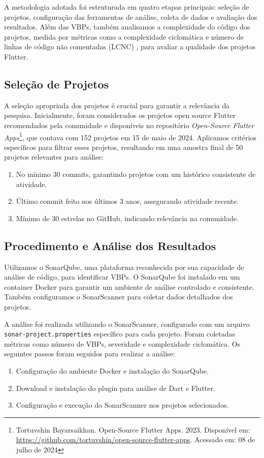 \documentclass[12pt]{article}
\begin{document}
A metodologia adotada foi estruturada em quatro etapas principais: seleção de projetos, configuração das ferramentas de análise, coleta de dados e avaliação dos resultados. Além das VBPs, também analisamos a complexidade do código dos projetos, medida por métricas como a complexidade ciclomática e número de linhas de código não comentadas (LCNC) \cite{mccabe1976complexity}, para avaliar a qualidade dos projetos Flutter.

\subsection{Seleção de Projetos}
A seleção apropriada dos projetos é crucial para garantir a relevância da pesquisa. Inicialmente, foram considerados os projetos open source Flutter recomendados pela comunidade e disponíveis no repositório \textit{Open-Source Flutter Apps}\footnote{Tortuvshin Bayarsaikhan. Open-Source Flutter Apps. 2023. Disponível em: \url{https://github.com/tortuvshin/open-source-flutter-apps}. Acessado em: 08 de julho de 2024}, que contava com 152 projetos em 15 de maio de 2024. Aplicamos critérios específicos para filtrar esses projetos, resultando em uma amostra final de 50 projetos relevantes para análise:
\begin{enumerate}
    \item No mínimo 30 commits, garantindo projetos com um histórico consistente de atividade.
    \item Último commit feito nos últimos 3 anos, assegurando atividade recente.
    \item Mínimo de 30 estrelas no GitHub, indicando relevância na comunidade.
\end{enumerate}


\subsection{Procedimento e Análise dos Resultados}
Utilizamos o SonarQube, uma plataforma reconhecida por sua capacidade de análise de código, para identificar VBPs. O SonarQube foi instalado em um container Docker para garantir um ambiente de análise controlado e consistente. Também configuramos o SonarScanner para coletar dados detalhados dos projetos.

A análise foi realizada utilizando o SonarScanner, configurado com um arquivo \texttt{sonar-project.properties} específico para cada projeto. Foram coletadas métricas como número de VBPs, severidade e complexidade ciclomática. Os seguintes passos foram seguidos para realizar a análise:
\begin{enumerate}
    \item Configuração do ambiente Docker e instalação do SonarQube.
    \item Download e instalação do plugin para análise de Dart e Flutter.
    \item Configuração e execução do SonarScanner nos projetos selecionados.
\end{enumerate}
\end{document}
